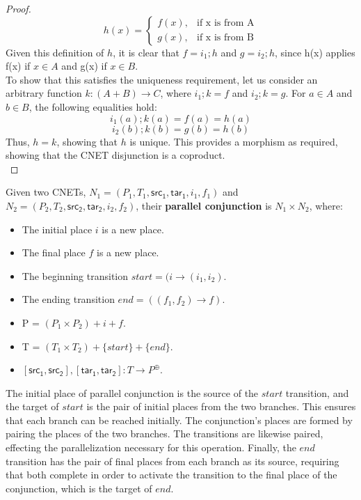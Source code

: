 \begin {proof}
  \begin{equation}
    h(x)=
    \begin{cases}
      f(x), & \text{if x is from A}\\
      g(x), & \text{if x is from B}
    \end{cases}
  \end{equation}
Given this definition of $h$, it is clear that $f = i_1;h$ and $g = i_2;h$, since h(x) applies f(x) if $x \in A$ and g(x) if $x \in B$.\\
To show that this satisfies the uniqueness requirement, let us consider an arbitrary function $k : (A+B) \to C$, where $i_1;k = f$ and $i_2;k = g$. For $a\in A$ and $b\in B$, the following equalities hold:\\ 
\begin{equation}
i_1(a);k(a) = f(a) = h(a) 
\end {equation}
\begin{equation}
i_2(b);k(b) = g(b) = h(b)
\end{equation}
Thus, $h = k$, showing that $h$ is unique. 
This provides a morphism as required, showing that the CNET disjunction is a coproduct.  
\bigskip\\
\end{proof}
\begin{definition}
  \label{def:PARA-AND-PN}
  Given two CNETs, $N_1= (P_1, T_1, \mathsf{src_1}, \mathsf{tar_1}, i_1, f_1)$ and $N_2= (P_2, T_2, \mathsf{src_2}, \mathsf{tar_2}, i_2, f_2)$, their \textbf{parallel conjunction} is $N_1 \times N_2$, where: 
\begin{itemize}
\item The initial place $i$ is a new place.
\item The final place $f$ is a new place.
\item The beginning transition $start = (i \to (i_1, i_2)$. 
\item The ending transition $end = ((f_1, f_2) \to f)$.
\item P = $(P_1 \times P_2) + i + f$.
\item T = $(T_1 \times T_2) + \{start\} +\{end\}$.
\item $[\mathsf{src_1}, \mathsf{src_2}], [\mathsf{tar_1}, \mathsf{tar_2}]: T\to P^\oplus$. 
\end{itemize}
The initial place of parallel conjunction is the source of the $start$ transition, and the target of $start$ is the pair of initial places from the two branches. This ensures that each branch can be reached initially. The conjunction's places are formed by pairing the places of the two branches. The transitions are likewise paired, effecting the parallelization necessary for this operation. Finally, the $end$ transition has the pair of final places from each branch as its source, requiring that both complete in order to activate the transition to the final place of the conjunction, which is the target of $end$. 
\end{definition}
